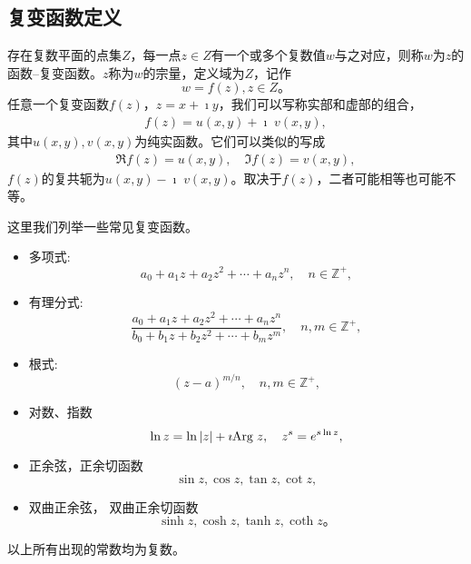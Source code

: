 \subsection{复变函数定义}
\label{sub:cmplx_func_def}

存在复数平面的点集$Z$，每一点$z\in Z$有一个或多个复数值$w$与之对应，则称$w$为$z$的函数--复变函数。$z$称为$w$的宗量，定义域为$Z$，记作
\begin{equation}
    w = f(z), z\in Z \textrm{。}
\end{equation}
任意一个复变函数$f(z)$，$z=x + \imath y$，我们可以写称实部和虚部的组合，
\begin{align}
    f(z) = u(x,y) +\imath \; v(x,y) ,
\end{align}
其中$u(x,y), v(x,y)$为纯实函数。它们可以类似的写成
\begin{align}
    \Re f(z) = u(x,y), \quad \Im f(z) = v(x,y) ,
\end{align}
$f(z)$的复共轭为$u(x,y) - \imath \; v(x,y)$。取决于$f(z)$，二者可能相等也可能不等。

这里我们列举一些常见复变函数。
\begin{itemize}
    \item 多项式:
        \begin{equation}
            a_0 + a_1 z + a_2 z^2 + \cdots + a_n z^n , \quad n\in \mathbb{Z}^+ ,
        \end{equation}
    \item 有理分式:       
         \begin{equation}
        \frac{a_0 + a_1 z + a_2 z^2 + \cdots + a_n z^n}{{b_0 + b_1 z + b_2 z^2 + \cdots + b_m z^m}} , \quad  n,m\in \mathbb{Z}^+ ,
        \end{equation}
    \item 根式:
        \begin{equation}
            (z-a)^{m/n} , \quad  n,m\in \mathbb{Z}^+ ,
        \end{equation}
    \item 对数、指数
        \begin{equation}
            \ln z = \ln |z| + \imath {\mathrm{Arg}\;} z, \quad z^s = e^{s\ln z} ,
        \end{equation}
    \item 正余弦，正余切函数 
        \begin{equation}
            \sin z , \cos z , \tan z, \cot z ,
        \end{equation}
    \item 双曲正余弦， 双曲正余切函数
        \begin{equation}
            \sinh z , \cosh z , \tanh z, \coth z  \textrm{。}
        \end{equation}
\end{itemize}
以上所有出现的常数均为复数。

